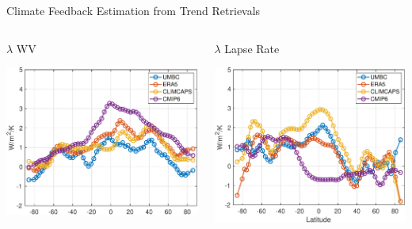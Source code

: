 \documentclass[10pt,t]{beamer}
\begin{document}
\begin{frame}{Climate Feedback Estimation from Trend Retrievals}
  \vspace{-0.2in}
  \begin{columns}[T]
    \begin{column}{0.5\columnwidth}
      \begin{block}{\footnotesize \(\lambda\) WV}
        \vspace{-0.15in}
        \begin{center}
          \includegraphics[width=0.85\linewidth]{Figslls/wv_lambda.pdf}
        \end{center}
      \end{block}
    \end{column}


    \begin{column}{0.5\columnwidth}
      \begin{block}{\footnotesize \(\lambda\) Lapse Rate}
        \vspace{-0.15in}
        \begin{center}
          \includegraphics[width=0.85\linewidth]{Figslls/lapse_lambda.pdf}
        \end{center}
      \end{block}
    \end{column}
  \end{columns}


\end{frame}
\end{document}

